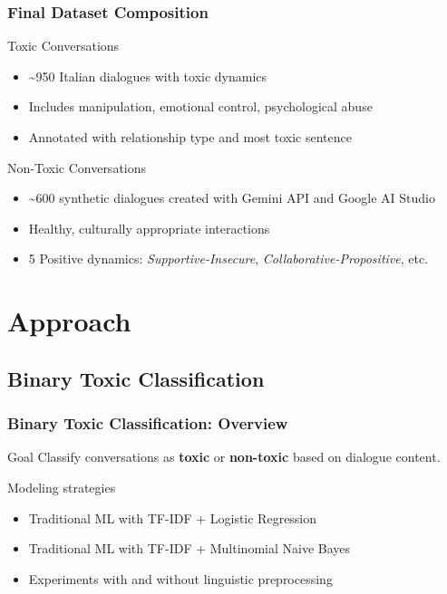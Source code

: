 \documentclass{beamer}
\begin{document}
\begin{frame}
\frametitle{Final Dataset Composition}

\begin{block}{Toxic Conversations}
\begin{itemize}
\item \textasciitilde 950 Italian dialogues with toxic dynamics
\item Includes manipulation, emotional control, psychological abuse
\item Annotated with relationship type and most toxic sentence
\end{itemize}
\end{block}

\begin{block}{Non-Toxic Conversations}
\begin{itemize}
\item \textasciitilde 600 synthetic dialogues created with Gemini API and Google AI Studio
\item Healthy, culturally appropriate interactions
\item 5 Positive dynamics: \textit{Supportive-Insecure}, \textit{Collaborative-Propositive}, etc.
\end{itemize}
\end{block}

\end{frame}

\section{Approach}

\subsection{Binary Toxic Classification}

\begin{frame}
\frametitle{Binary Toxic Classification: Overview}

\begin{block}{Goal}
Classify conversations as \textbf{toxic} or \textbf{non-toxic} based on dialogue content.
\end{block}

\begin{block}{Modeling strategies}
\begin{itemize}
\item Traditional ML with TF-IDF + Logistic Regression
\item Traditional ML with TF-IDF + Multinomial Naive Bayes
\item Experiments with and without linguistic preprocessing
\end{itemize}
\end{block}

\end{frame}
\end{document}
